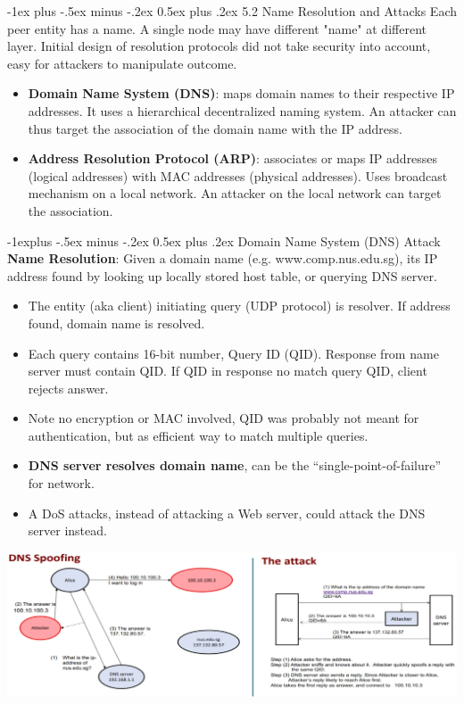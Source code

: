 \documentclass[10pt, landscape]{article}
\makeatletter
\renewcommand{\section}{\@startsection{section}{1}{0mm}%
                                {-1ex plus -.5ex minus -.2ex}%
                                {0.5ex plus .2ex}%
                                {\normalfont\large\bfseries}}
\renewcommand{\subsection}{\@startsection{subsection}{2}{0mm}%
                                {-1explus -.5ex minus -.2ex}%
                                {0.5ex plus .2ex}%
                                {\normalfont\normalsize\bfseries}}
\makeatother
\begin{document}
\begin{multicols*}{3}
\section{5.2 Name Resolution and Attacks}
Each peer entity has a name. A single node may have different "name" at different layer. Initial design of resolution protocols did not take security into account, easy for attackers to manipulate outcome. 

\begin{itemize}
\item \textbf{Domain Name System (DNS)}: maps domain names to their respective IP addresses. It uses a hierarchical decentralized naming system. An attacker can thus target the association of the domain name with the IP address.
\item \textbf{Address Resolution Protocol (ARP)}: associates or maps IP addresses (logical addresses) with MAC addresses (physical addresses). Uses broadcast mechanism on a local network. An attacker on the local network can target the association.
\end{itemize}

\subsection{Domain Name System (DNS) Attack}
\textbf{Name Resolution}: Given a domain name (e.g. www.comp.nus.edu.sg), its IP address found by looking up locally stored host table, or querying DNS server.
\begin{itemize}
\item The entity (aka client) initiating query (UDP protocol) is resolver. If address found, domain name is resolved. 
\item Each query contains 16-bit number, Query ID (QID). Response from name server must contain QID. If QID in response no match query QID, client rejects answer. 
\item Note no encryption or MAC involved, QID was probably not meant for authentication, but as efficient way to match multiple queries. 
\item \textbf{DNS server resolves domain name}, can be the “single-point-of-failure” for network. 
\item A DoS attacks, instead of attacking a Web server, could attack the DNS server instead.
\end{itemize}

\centerline{\includegraphics[width=1\linewidth]{DNSSpoofing}}


\end{multicols*}
\end{document}
